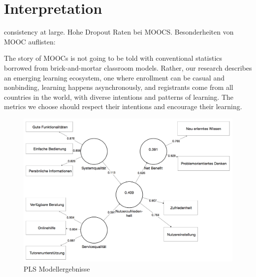 \section{Interpretation}
\label{sec:vergleich}

\todo consistency at large. 
Hohe Dropout Raten bei MOOCS. Besonderheiten von MOOC auflisten: 


The story of MOOCs is not going to be told with conventional statistics borrowed from brick-and-mortar classroom models. Rather, our research describes an emerging learning ecosystem, one where enrollment can be casual and nonbinding, learning happens asynchronously, and registrants come from all countries in the world, with diverse intentions and patterns of learning. The metrics we choose should respect their intentions and encourage their learning.\parencite{reich2014tricky}


\begin{figure}[h]
\centering
\includegraphics[width=1\textwidth]{Grafiken/pls_bw_2.png}
\caption{PLS Modellergebnisse}
\label{PLS Modellergebnisse}
\end{figure}